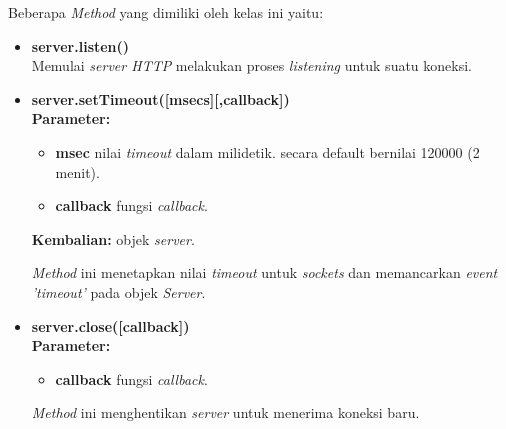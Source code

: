 \begin{enumerate}
	Beberapa \textit{Method} yang dimiliki oleh kelas ini yaitu:
	\begin{itemize}
		\item \textbf{server.listen()} \\ Memulai \textit{server HTTP} melakukan proses \textit{listening} untuk suatu koneksi.
		
		\item \textbf{server.setTimeout([msecs][,callback])} \\ \textbf{Parameter:}
		\begin{itemize}
			\item \textbf{msec} nilai \textit{timeout} dalam milidetik. secara default bernilai 120000 (2 menit).
			\item \textbf{callback} fungsi \textit{callback}.
		\end{itemize}
		\textbf{Kembalian:} objek \textit{server}.
		
		\textit{Method} ini menetapkan nilai \textit{timeout} untuk \textit{sockets} dan memancarkan \textit{event 'timeout'} pada objek \textit{Server}.
		
		\item \textbf{server.close([callback])} \\ \textbf{Parameter:}
		\begin{itemize}
			\item \textbf{callback} fungsi \textit{callback}.
		\end{itemize} 
		
		\textit{Method} ini menghentikan \textit{server} untuk menerima koneksi baru.
	\end{itemize}
\end{enumerate} 

